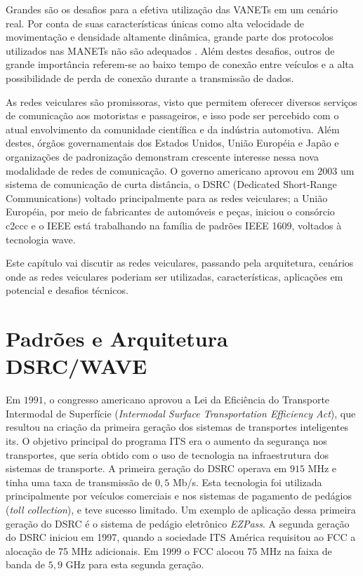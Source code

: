 Grandes são os desafios para a efetiva utilização das VANETs em um cenário
real. Por conta de suas características únicas como alta velocidade de
movimentação e densidade altamente dinâmica, grande parte dos protocolos
utilizados nas MANETs não são adequados \cite{taha2007vanet}. Além destes
desafios, outros de grande importância referem-se ao baixo tempo de conexão
entre veículos e a alta possibilidade de perda de conexão durante a
transmissão de dados.

As redes veiculares são promissoras, visto que permitem oferecer diversos
serviços de comunicação aos motoristas e passageiros, e isso pode ser percebido
com o atual envolvimento da comunidade científica e da indústria automotiva.
Além destes, órgãos governamentais dos Estados Unidos, União Européia e Japão e
organizações de padronização demonstram crescente interesse nessa nova
modalidade de redes de comunicação. O governo americano aprovou em $2003$ um
sistema de comunicação de curta distância, o DSRC (Dedicated
Short-Range Communications) voltado principalmente para as redes veiculares;
a União Européia, por meio de fabricantes de automóveis e peças, iniciou o
consórcio \gls{c2ccc} e o IEEE está trabalhando na
família de padrões IEEE 1609, voltados à tecnologia \gls{wave}.

Este capítulo vai discutir as redes veiculares, passando pela arquitetura,
cenários onde as redes veiculares poderiam ser utilizadas, características,
aplicações em potencial e desafios técnicos.

\section{Padrões e Arquitetura DSRC/WAVE}
Em $1991$, o congresso americano aprovou a Lei da Eficiência do Transporte
Intermodal de Superfície (\textit{Intermodal Surface Transportation
Efficiency Act}), que resultou na criação da primeira geração dos sistemas de
transportes inteligentes \gls{its}. O objetivo principal do programa ITS era o aumento da segurança nos
transportes, que seria obtido com o uso de tecnologia na infraestrutura dos
sistemas de transporte. A primeira geração do DSRC operava em $915$ MHz e tinha
uma taxa de transmissão de $0,5$ Mb/s. Esta tecnologia foi utilizada
principalmente por veículos comerciais e nos sistemas de pagamento de pedágios
(\textit{toll collection}), e teve sucesso limitado. Um exemplo de aplicação
dessa primeira geração do DSRC é o sistema de pedágio eletrônico
\textit{EZPass}. A segunda geração do DSRC iniciou em 1997, quando a sociedade
ITS América requisitou ao FCC a alocação de 75 MHz adicionais. Em 1999 o FCC
alocou 75 MHz na faixa de banda de $5,9$ GHz para esta segunda geração.

